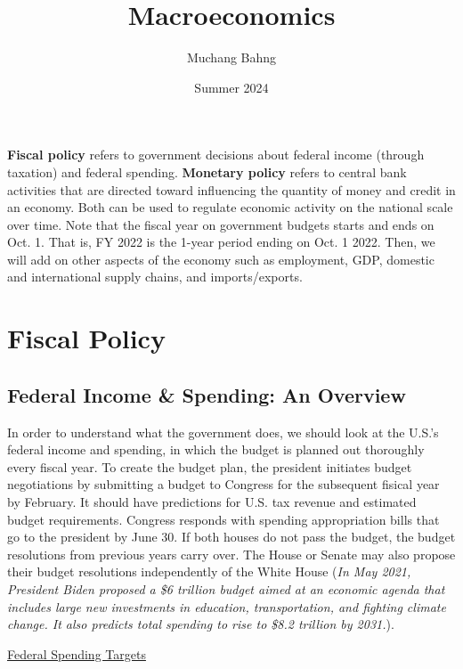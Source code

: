 \documentclass{article}
\begin{document}
\title{Macroeconomics}
\author{Muchang Bahng}
\date{Summer 2024}

\maketitle
\tableofcontents
\pagebreak

\textbf{Fiscal policy} refers to government decisions about federal income (through taxation) and federal spending. \textbf{Monetary policy} refers to central bank activities that are directed toward influencing the quantity of money and credit in an economy. Both can be used to regulate economic activity on the national scale over time. Note that the fiscal year on government budgets starts and ends on Oct. 1. That is, FY 2022 is the 1-year period ending on Oct. 1 2022. Then, we will add on other aspects of the economy such as employment, GDP, domestic and international supply chains, and imports/exports.

\section{Fiscal Policy}

  \subsection{Federal Income \& Spending: An Overview}

    In order to understand what the government does, we should look at the U.S.'s federal income and spending, in which the budget is planned out thoroughly every fiscal year. To create the budget plan, the president initiates budget negotiations by submitting a budget to Congress for the subsequent fisical year by February. It should have predictions for U.S. tax revenue and estimated budget requirements. Congress responds with spending appropriation bills that go to the president by June 30. If both houses do not pass the budget, the budget resolutions from previous years carry over. The House or Senate may also propose their budget resolutions independently of the White House (\textit{In May 2021, President Biden proposed a \$6 trillion budget aimed at an economic agenda that includes large new investments in education, transportation, and fighting climate change. It also predicts total spending to rise to \$8.2 trillion by 2031.}).

    \underline{Federal Spending Targets}
\end{document}
